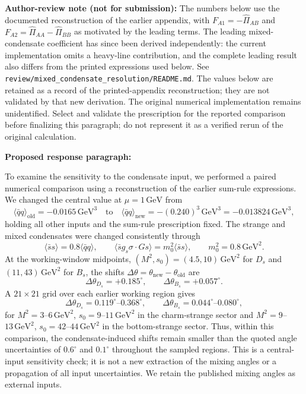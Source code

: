 
\noindent\textbf{Author-review note (not for submission):}
The numbers below use the documented reconstruction of the earlier appendix,
with $F_{A1}=-\widehat\Pi_{AB}$ and
$F_{A2}=\widehat\Pi_{AA}-\widehat\Pi_{BB}$ as motivated by the leading terms.
The leading mixed-condensate coefficient has since been derived independently:
the current implementation omits a heavy-line contribution, and the complete
leading result also differs from the printed expressions used below.
See \texttt{review/mixed\_condensate\_resolution/README.md}.
The values below are retained as a record of the printed-appendix
reconstruction; they are not validated by that new derivation. The original
numerical implementation remains unidentified. Select and validate the
prescription for the reported comparison before finalizing this paragraph;
do not represent it as a verified rerun of the original calculation.

\medskip
\noindent\textbf{Proposed response paragraph:}

To examine the sensitivity to the condensate input, we performed a paired
numerical comparison using a reconstruction of the earlier sum-rule
expressions. We changed the central value at $\mu=1\,\mathrm{GeV}$ from
\begin{equation}
\langle\bar q q\rangle_{\mathrm{old}}
=-0.0165\,\mathrm{GeV}^3
\quad\text{to}\quad
\langle\bar q q\rangle_{\mathrm{new}}
=-(0.240)^3\,\mathrm{GeV}^3
=-0.013824\,\mathrm{GeV}^3,
\end{equation}
holding all other inputs and the sum-rule prescription fixed.
The strange and mixed condensates were changed consistently through
\begin{equation}
\langle\bar s s\rangle=0.8\langle\bar q q\rangle,
\qquad
\langle\bar s g_s\sigma\!\cdot\!G s\rangle
=m_0^2\langle\bar s s\rangle,
\qquad m_0^2=0.8\,\mathrm{GeV}^2.
\end{equation}
At the working-window midpoints, $(M^2,s_0)=(4.5,10)\,\mathrm{GeV}^2$
for $D_s$ and $(11,43)\,\mathrm{GeV}^2$ for $B_s$, the shifts
$\Delta\theta=\theta_{\mathrm{new}}-\theta_{\mathrm{old}}$ are
\begin{equation}
\Delta\theta_{D_s}=+0.185^\circ,
\qquad
\Delta\theta_{B_s}=+0.057^\circ.
\end{equation}
A $21\times21$ grid over each earlier working region gives
\begin{equation}
\Delta\theta_{D_s}=0.119^\circ\text{--}0.368^\circ,
\qquad
\Delta\theta_{B_s}=0.044^\circ\text{--}0.080^\circ,
\end{equation}
for $M^2=3$--$6\,\mathrm{GeV}^2$, $s_0=9$--$11\,\mathrm{GeV}^2$
in the charm-strange sector and $M^2=9$--$13\,\mathrm{GeV}^2$,
$s_0=42$--$44\,\mathrm{GeV}^2$ in the bottom-strange sector.
Thus, within this comparison, the condensate-induced shifts remain smaller
than the quoted angle uncertainties of $0.6^\circ$ and $0.1^\circ$ throughout
the sampled regions. This is a central-input sensitivity check; it is not
a new extraction of the mixing angles or a propagation of all input
uncertainties. We retain the published mixing angles as external inputs.
